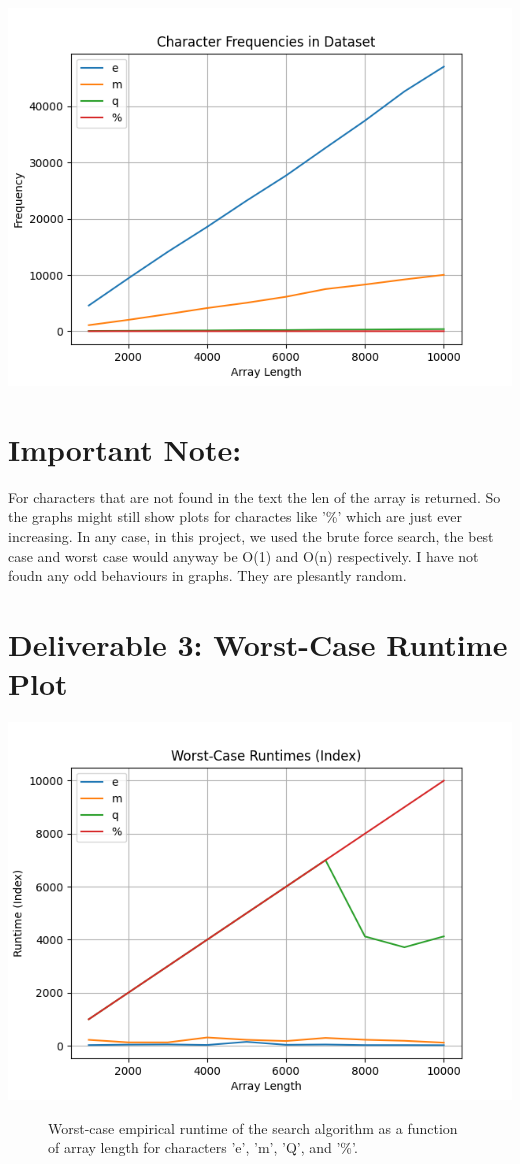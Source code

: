 \documentclass{article}
\begin{document}
\includegraphics[width='13cm']{character_frequencies_in_dataset.png}

\section*{Important Note: }
For characters that are not found in the text the len of the array is returned. So the graphs might still show plots for charactes like '\%'
which are just ever increasing. In any case, in this project, we used the brute force search, the best case and worst case would anyway be O(1) and O(n) respectively.
I have not foudn any odd behaviours in graphs. They are plesantly random. 
\section*{Deliverable 3: Worst-Case Runtime Plot}

\includegraphics[width=\textwidth]{worst-case_runtimes_(index).png} \label{Figure 1}
\begin{figure}
    \caption{Worst-case empirical runtime of the search algorithm as a function of array length for characters 'e', 'm', 'Q', and '\%'.}
\end{figure}
\end{document}
